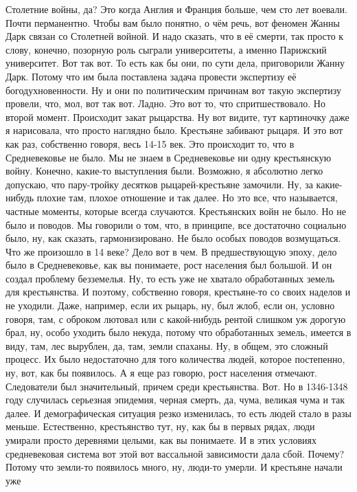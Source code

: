 Столетние войны, да? Это когда Англия и Франция больше, чем сто лет воевали.
Почти перманентно. Чтобы вам было понятно, о чём речь, вот феномен Жанны Дарк
связан со Столетней войной. И надо сказать, что в её смерти, так просто к слову,
конечно, позорную роль сыграли университеты, а именно Парижский университет. Вот
так вот. То есть как бы они, по сути дела, приговорили Жанну Дарк. Потому что им
была поставлена задача провести экспертизу её богодухновенности. Ну и они по
политическим причинам вот такую экспертизу провели, что, мол, вот так вот.
Ладно. Это вот то, что спритшествовало. Но второй момент. Происходит закат
рыцарства. Ну вот видите, тут картиночку даже я нарисовала, что просто наглядно
было. Крестьяне забивают рыцаря. И это вот как раз, собственно говоря, весь
14-15 век. Это происходит то, что в Средневековье не было. Мы не знаем в
Средневековье ни одну крестьянскую войну. Конечно, какие-то выступления были.
Возможно, я абсолютно легко допускаю, что пару-тройку десятков рыцарей-крестьяне
замочили. Ну, за какие-нибудь плохие там, плохое отношение и так далее. Но это
все, что называется, частные моменты, которые всегда случаются. Крестьянских
войн не было. Но не было и поводов. Мы говорили о том, что, в принципе, все
достаточно социально было, ну, как сказать, гармонизировано. Не было особых
поводов возмущаться. Что же произошло в 14 веке? Дело вот в чем. В
предшествующую эпоху, дело было в Средневековье, как вы понимаете, рост
населения был большой. И он создал проблему безземелья. Ну, то есть уже не
хватало обработанных земель для крестьянства. И поэтому, собственно говоря,
крестьяне-то со своих наделов и не уходили. Даже, например, если их рыцарь, ну,
был жлоб, если он, условно говоря, там, с оброком лютовал или с какой-нибудь
рентой слишком уж дорогую брал, ну, особо уходить было некуда, потому что
обработанных земель, имеется в виду, там, лес вырублен, да, там, земли спаханы.
Ну, в общем, это сложный процесс. Их было недостаточно для того количества
людей, которое постепенно, ну, вот, как бы появилось. А я еще раз говорю, рост
населения отмечают. Следователи был значительный, причем среди крестьянства.
Вот. Но в 1346-1348 году случилась серьезная эпидемия, черная смерть, да, чума,
великая чума и так далее. И демографическая ситуация резко изменилась, то есть
людей стало в разы меньше. Естественно, крестьянство тут, ну, как бы в первых
рядах, люди умирали просто деревнями целыми, как вы понимаете. И в этих условиях
средневековая система вот этой вот вассальной зависимости дала сбой. Почему?
Потому что земли-то появилось много, ну, люди-то умерли. И крестьяне начали уже
